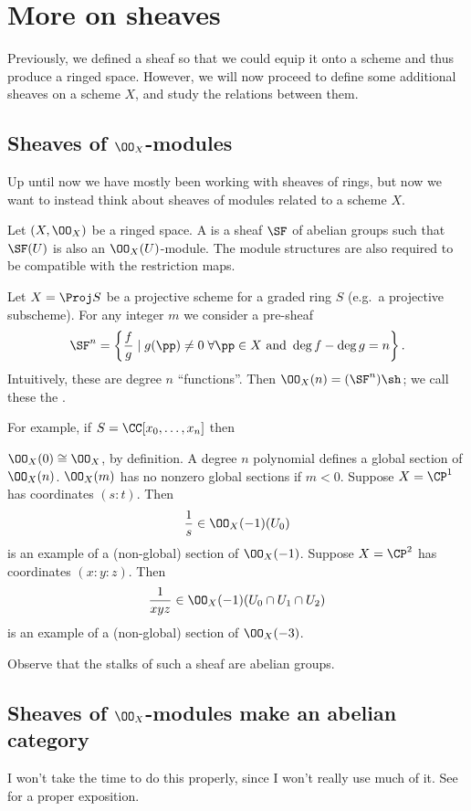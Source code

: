 \chapter{More on sheaves}
Previously, we defined a sheaf so that we could equip
it onto a scheme and thus produce a ringed space.
However, we will now proceed to define some additional sheaves on a scheme $X$,
and study the relations between them.

\section{Sheaves of $\OO_X$-modules}
Up until now we have mostly been working with sheaves of rings,
but now we want to instead think about sheaves of modules related
to a scheme $X$. 
\begin{definition}
	Let $(X, \OO_X)$ be a ringed space.
	A  is a sheaf $\SF$
	of abelian groups such that $\SF(U)$ is also an $\OO_X(U)$-module.
	The module structures are also required to be compatible
	with the restriction maps.
\end{definition}
\begin{example}
	Let $X = \Proj S$ be a projective scheme for a graded ring $S$
	(e.g.\ a projective subscheme).
	For any integer $m$ we consider a pre-sheaf
	\[ \SF^n = \left\{ \frac fg \mid g(\pp)\neq 0 \;\forall \pp \in X 
		\text{ and } \deg f - \deg g = n \right\}.
	\]
	Intuitively, these are degree $n$ ``functions''.
	Then $\OO_X(n) = (\SF^n)\sh$;
	we call these the .

	For example, if $S = \CC[x_0, \dots, x_n]$ then
	\begin{enumerate}[(a)]
		\ii $\OO_X(0) \cong \OO_X$, by definition.
		\ii A degree $n$ polynomial defines a global section of $\OO_X(n)$.
		\ii $\OO_X(m)$ has no nonzero global sections if $m < 0$.
		\ii Suppose $X = \CP^1$ has coordinates $(s:t)$. Then
		\[ \frac 1s \in \OO_X(-1)(U_0) \]
		is an example of a (non-global) section of $\OO_X(-1)$.
		\ii Suppose $X = \CP^2$ has coordinates $(x:y:z)$. Then
		\[ \frac{1}{xyz} \in \OO_X(-1)(U_0 \cap U_1 \cap U_2) \]
		is an example of a (non-global) section of $\OO_X(-3)$.
	\end{enumerate}
\end{example}

Observe that the stalks of such a sheaf are abelian groups.

\section{Sheaves of $\OO_X$-modules make an abelian category}
I won't take the time to do this properly,
since I won't really use much of it.
See \cite{ref:vakil} for a proper exposition.

